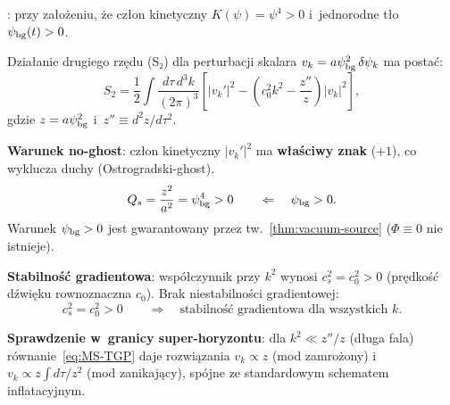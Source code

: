 \begin{proposition}%
\label{prop:ghost-free-MS}
: przy za\l{}o\.zeniu, \.ze cz\l{}on kinetyczny
$K(\psi) = \psi^4 > 0$ i~jednorodne t\l{}o $\psi_{\rm bg}(t) > 0$.

\medskip\noindent
Dzia\l{}anie drugiego rz\k{e}du (S₂) dla perturbacji skalara
$v_k = a\psi_{\rm bg}^2\,\delta\psi_k$ ma posta\'c:
\begin{equation}\label{eq:S2-MS-TGP}
  S_2 = \frac{1}{2}\int\frac{d\tau\,d^3k}{(2\pi)^3}
  \left[|v_k'|^2 - \left(c_0^2 k^2 - \frac{z''}{z}\right)|v_k|^2\right],
\end{equation}
gdzie $z = a\psi_{\rm bg}^2$ i~$z'' \equiv d^2z/d\tau^2$.

\medskip\noindent
\textbf{Warunek no-ghost}: cz\l{}on kinetyczny $|v_k'|^2$ ma
\textbf{w\l{}a\'sciwy znak} ($+1$), co wyklucza duchy (Ostrogradski-ghost).
\begin{equation}\label{eq:no-ghost}
  Q_s = \frac{z^2}{a^2} = \psi_{\rm bg}^4 > 0
  \qquad\Leftarrow\quad \psi_{\rm bg} > 0.
\end{equation}
Warunek $\psi_{\rm bg} > 0$ jest gwarantowany przez tw.~\ref{thm:vacuum-source}
($\Phi \equiv 0$ nie istnieje).

\medskip\noindent
\textbf{Stabilno\'s\'c gradientowa}: wsp\'o\l{}czynnik przy $k^2$ wynosi
$c_s^2 = c_0^2 > 0$ (pr\k{e}dko\'s\'c d\'zwi\k{e}ku rownoznaczna $c_0$).
Brak niestabilno\'sci gradientowej:
\begin{equation}\label{eq:gradient-stable}
  c_s^2 = c_0^2 > 0
  \qquad \Rightarrow \quad \text{stabilno\'s\'c gradientowa dla wszystkich $k$}.
\end{equation}

\medskip\noindent
\textbf{Sprawdzenie w~granicy super-horyzontu}:
dla $k^2 \ll z''/z$ (d\l{}uga fala) r\'ownanie~\eqref{eq:MS-TGP}
daje rozwi\k{a}zania $v_k \propto z$ (mod zamrożony)
i~$v_k \propto z\int d\tau/z^2$ (mod zanikaj\k{a}cy),
sp\'ojne ze standardowym schematem inflatacyjnym.
\end{proposition}

